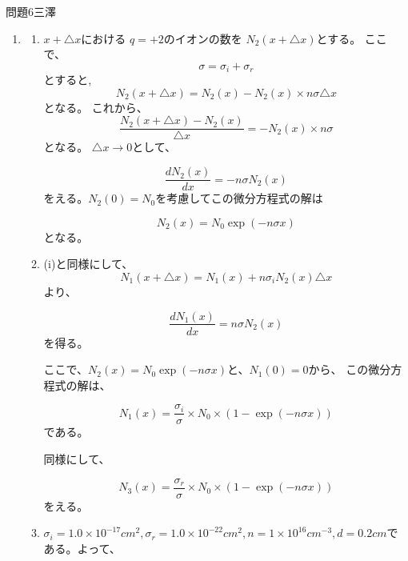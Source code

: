 \documentclass[fleqn]{jbook}
\begin{document}
\begin{answer}{問題6}{三澤}
\begin{enumerate}
\item
\begin{enumerate}
\item
$x+\triangle x$における $q=+2$のイオンの数を
$N_2(x+\triangle x)$とする。
ここで、
\begin{equation}
　\sigma = \sigma_i +\sigma_r
\end{equation}
とすると,
\begin{equation}
N_2(x+\triangle x)=N_2(x)-N_2(x)\times n\sigma\triangle x 
\end{equation}
となる。
これから、
\begin{equation}
 \frac{N_2(x+\triangle x)-N_2(x)}{\triangle x} = -N_2(x)\times n\sigma 
\end{equation}
となる。
$\triangle x\to0$として、

\begin{equation}
　　\frac{dN_2(x)}{dx} = -n\sigma N_2(x) 
\end{equation}
をえる。$N_2(0)=N_0$を考慮してこの微分方程式の解は

\begin{equation}
N_2(x)=N_0\exp(-n\sigma x)
\end{equation}
となる。

\item
(i)と同様にして、
\begin{equation}
N_1(x+\triangle x)=N_1(x)+n\sigma_i N_2(x)\triangle x
\end{equation}
より、

\begin{equation}
\frac{dN_1(x)}{dx} = n\sigma N_2(x) 
\end{equation}
を得る。

ここで、$ N_2(x)=N_0\exp(-n\sigma x)$と、$N_1(0)=0$から、
この微分方程式の解は、

\begin{equation}
N_1(x)=\frac{\sigma_i}{\sigma}\times N_0\times (1-\exp(-n\sigma x) ) 
\end{equation}
である。

同様にして、

\begin{equation}
N_3(x)=\frac{\sigma_r}{\sigma}\times N_0\times (1-\exp(-n\sigma x) ) 
\end{equation}
をえる。

\item
$\sigma_i=1.0\times 10^{-17} cm^2,\sigma_r=1.0\times 10^{-22}cm^2,n=1\times 10^{16} cm^{-3},
d=0.2cm $である。よって、


\end{enumerate}
\end{enumerate}
\end{answer}
\end{document}

